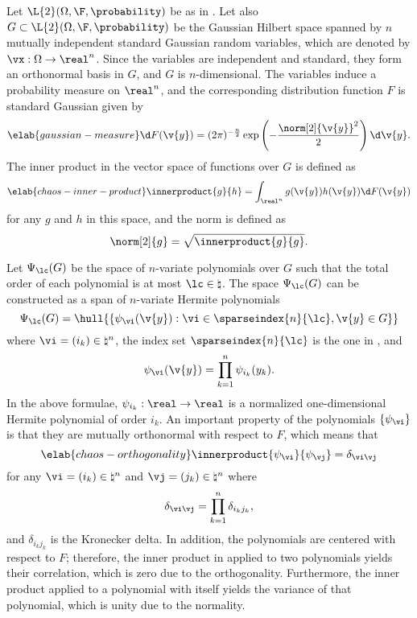 Let $\L{2}(\Omega, \F, \probability)$ be as in .
Let also $G \subset \L{2}(\Omega, \F, \probability)$ be the Gaussian Hilbert
space \cite{janson1997} spanned by $n$ mutually independent standard Gaussian
random variables, which are denoted by $\vx: \Omega \to \real^n$. Since the
variables are independent and standard, they form an orthonormal basis in $G$,
and $G$ is $n$-dimensional. The variables induce a probability measure on
$\real^n$, and the corresponding distribution function $F$ is standard Gaussian
given by
\begin{equation} \elab{gaussian-measure}
  \d F(\v{y}) = (2 \pi)^{-\frac{n}{2}} \exp\left(-\frac{\norm[2]{\v{y}}^2}{2}\right) \d \v{y}.
\end{equation}
The inner product in the vector space of functions over $G$ is defined as
\begin{equation} \elab{chaos-inner-product}
  \innerproduct{g}{h} = \int_{\real^n} g(\v{y}) h(\v{y}) \d F(\v{y})
\end{equation}
for any $g$ and $h$ in this space, and the norm is defined as
\[
  \norm[2]{g} = \sqrt{\innerproduct{g}{g}}.
\]

Let $\Psi_\lc(G)$ be the space of $n$-variate polynomials over $G$ such that the
total order of each polynomial is at most $\lc \in \natural$. The space
$\Psi_\lc(G)$ can be constructed as a span of $n$-variate Hermite polynomials
\cite{eldred2008, maitre2010}
\[
  \Psi_\lc(G) = \hull{\left\{ \psi_{\vi}(\v{y}): \vi \in \sparseindex{n}{\lc}, \v{y} \in G \right\}}
\]
where $\vi = (i_k) \in \natural^n$, the index set $\sparseindex{n}{\lc}$ is the
one in , and
\[
  \psi_{\vi}(\v{y}) = \prod_{k = 1}^n \psi_{i_k}(y_k).
\]
In the above formulae, $\psi_{i_k}: \real \to \real$ is a normalized
one-dimensional Hermite polynomial of order $i_k$. An important property of the
polynomials $\{ \psi_{\vi} \}$ is that they are mutually orthonormal with
respect to $F$, which means that
\begin{equation} \elab{chaos-orthogonality}
  \innerproduct{\psi_{\vi}}{\psi_{\vj}} = \delta_{\vi \vj}
\end{equation}
for any $\vi = (i_k) \in \natural^n$ and $\vj = (j_k) \in \natural^n$ where
\[
  \delta_{\vi \vj} = \prod_{k = 1}^n \delta_{i_k j_k},
\]
and $\delta_{i_k j_k}$ is the Kronecker delta. In addition, the polynomials are
centered with respect to $F$; therefore, the inner product in
 applied to two polynomials yields their correlation,
which is zero due to the orthogonality. Furthermore, the inner product applied
to a polynomial with itself yields the variance of that polynomial, which is
unity due to the normality.

